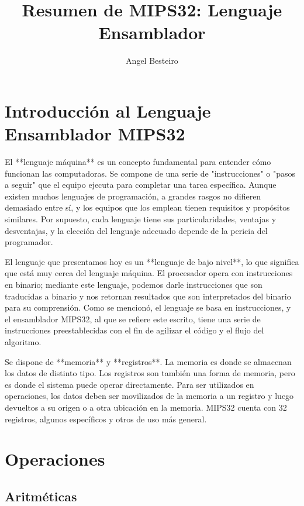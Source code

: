 \documentclass{article}
\title{Resumen de MIPS32: Lenguaje Ensamblador}
\author{Angel Besteiro}
\date{}
\begin{document}
\maketitle

\section*{Introducción al Lenguaje Ensamblador MIPS32}

El **lenguaje máquina** es un concepto fundamental para entender cómo funcionan las computadoras. Se compone de una serie de "instrucciones" o "pasos a seguir" que el equipo ejecuta para completar una tarea específica. Aunque existen muchos lenguajes de programación, a grandes rasgos no difieren demasiado entre sí, y los equipos que los emplean tienen requisitos y propósitos similares. Por supuesto, cada lenguaje tiene sus particularidades, ventajas y desventajas, y la elección del lenguaje adecuado depende de la pericia del programador.

El lenguaje que presentamos hoy es un **lenguaje de bajo nivel**, lo que significa que está muy cerca del lenguaje máquina. El procesador opera con instrucciones en binario; mediante este lenguaje, podemos darle instrucciones que son traducidas a binario y nos retornan resultados que son interpretados del binario para su comprensión. Como se mencionó, el lenguaje se basa en instrucciones, y el ensamblador MIPS32, al que se refiere este escrito, tiene una serie de instrucciones preestablecidas con el fin de agilizar el código y el flujo del algoritmo.

Se dispone de **memoria** y **registros**. La memoria es donde se almacenan los datos de distinto tipo. Los registros son también una forma de memoria, pero es donde el sistema puede operar directamente. Para ser utilizados en operaciones, los datos deben ser movilizados de la memoria a un registro y luego devueltos a su origen o a otra ubicación en la memoria. MIPS32 cuenta con 32 registros, algunos específicos y otros de uso más general.

\section*{Operaciones}

\subsection*{Aritméticas}
\end{document}
